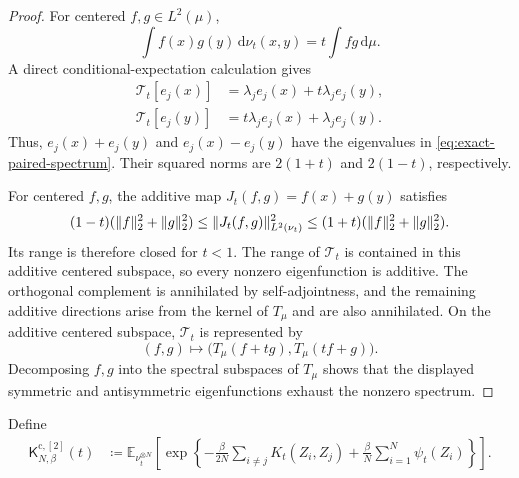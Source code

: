 \documentclass[11pt,reqno]{amsart}
\numberwithin{equation}{section}
\theoremstyle{plain}
\theoremstyle{remark}
\DeclarePairedDelimiter{\norm}{\lVert}{\rVert}
\newcommand{\md}{\mathrm{d}}
\newcommand{\E}{{\mathbb{E}}}
\newcommand{\K}{{\mathsf{K}}}
\newcommand{\be}{\beta}
\begin{document}
\begin{proof}
For centered $f,g\in L^2(\mu)$,
\begin{equation}\label{eq:exact-nu-cross}
 \int f(x)g(y)\,\md\nu_t(x,y)
 =t\int fg\,\md\mu.
\end{equation}
A direct conditional-expectation calculation gives
\begin{align}
 \mathcal T_t[e_j(x)]
 &=\lambda_je_j(x)+t\lambda_je_j(y),\label{eq:exact-Tt-ejx}\\
 \mathcal T_t[e_j(y)]
 &=t\lambda_je_j(x)+\lambda_je_j(y).
 \label{eq:exact-Tt-ejy}
\end{align}
Thus, $e_j(x)+e_j(y)$ and $e_j(x)-e_j(y)$ have the eigenvalues in \eqref{eq:exact-paired-spectrum}.  Their squared norms are $2(1+t)$ and $2(1-t)$, respectively.

For centered $f,g$, the additive map $J_t(f,g)=f(x)+g(y)$ satisfies
\begin{equation}\label{eq:quantitative-additive-equivalence}
 (1-t)(\norm f_2^2+\norm g_2^2)\leq\norm{J_t(f,g)}_{L^2(\nu_t)}^2
 \leq(1+t)(\norm f_2^2+\norm g_2^2).
\end{equation}
Its range is therefore closed for $t<1$.  The range of $\mathcal T_t$ is contained in this additive centered subspace, so every nonzero eigenfunction is additive.  The orthogonal complement is annihilated by self-adjointness, and the remaining additive directions arise from the kernel of $T_\mu$ and are also annihilated.  On the additive centered subspace, $\mathcal T_t$ is represented by
\begin{equation}\label{eq:exact-additive-matrix}
 (f,g)\longmapsto
 \big(T_\mu(f+tg),T_\mu(tf+g)\big).
\end{equation}
Decomposing $f,g$ into the spectral subspaces of $T_\mu$ shows that the displayed symmetric and antisymmetric eigenfunctions exhaust the nonzero spectrum.
\end{proof}


Define
\begin{align}
 \K^{\mathrm c,[2]}_{N,\be}(t)
 &\coloneqq\E_{\nu_t^{\otimes N}}\left[
 \exp\left\{-\frac{\be}{2N}\sum_{i\ne j}K_t(Z_i,Z_j)
 +\frac{\be}{N}\sum_{i=1}^N\psi_t(Z_i)\right\}\right].
 \label{eq:exact-paired-partition}
\end{align}
\end{document}
